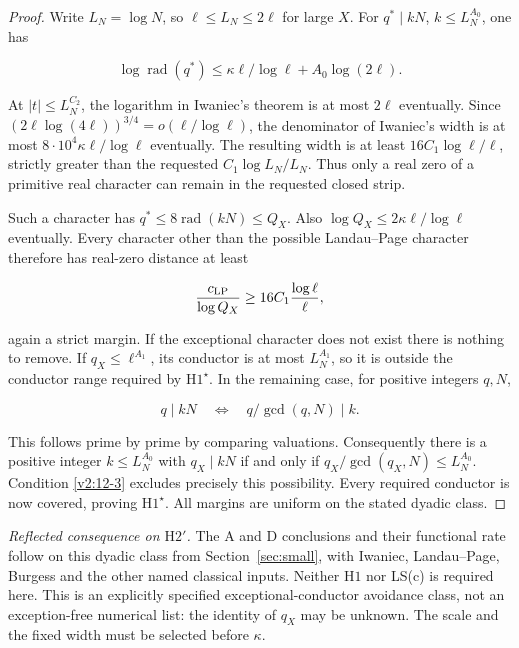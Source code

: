 \documentclass[11pt]{article}
\theoremstyle{definition}
\theoremstyle{remark}
\numberwithin{equation}{section}
\begin{document}
\begin{proof} Write $L_N=\log N$, so $\ell\le L_N\le2\ell$ for large $X$. For $q^*\mid kN$, $k\le L_N^{A_0}$, one has


\begin{equation}
\log\operatorname{rad}(q^*)\le\kappa\ell/\log\ell+A_0\log(2\ell).
\end{equation}


At $|t|\le L_N^{C_2}$, the logarithm in Iwaniec's theorem is at most $2\ell$ eventually. Since $(2\ell\log(4\ell))^{3/4}=o(\ell/\log\ell)$, the denominator of Iwaniec's width is at most $8\cdot10^4\kappa\ell/\log\ell$ eventually. The resulting width is at least $16C_1\log\ell/\ell$, strictly greater than the requested $C_1\log L_N/L_N$. Thus only a real zero of a primitive real character can remain in the requested closed strip.

Such a character has $q^*\le8\operatorname{rad}(kN)\le Q_X$. Also $\log Q_X\le2\kappa\ell/\log\ell$ eventually. Every character other than the possible Landau--Page character therefore has real-zero distance at least


\begin{equation}
\frac{c_{\rm LP}}{\log Q_X}\ge16C_1\frac{\log\ell}{\ell},
\end{equation}


again a strict margin. If the exceptional character does not exist there is nothing to remove. If $q_X\le\ell^{A_1}$, its conductor is at most $L_N^{A_1}$, so it is outside the conductor range required by $\mathrm H1^\star$. In the remaining case, for positive integers $q,N$,


\begin{equation}
q\mid kN\quad\Longleftrightarrow\quad q/\gcd(q,N)\mid k.
\end{equation}


This follows prime by prime by comparing valuations. Consequently there is a positive integer $k\le L_N^{A_0}$ with $q_X\mid kN$ if and only if $q_X/\gcd(q_X,N)\le L_N^{A_0}$. Condition \eqref{v2:12-3} excludes precisely this possibility. Every required conductor is now covered, proving $\mathrm H1^\star$. All margins are uniform on the stated dyadic class. \end{proof}

\emph{Reflected consequence on $\mathrm H2'$.} The A and D conclusions and their functional rate follow on this dyadic class from Section~\ref{sec:small}, with Iwaniec, Landau--Page, Burgess and the other named classical inputs. Neither $\mathrm H1$ nor LS(c) is required here. This is an explicitly specified exceptional-conductor avoidance class, not an exception-free numerical list: the identity of $q_X$ may be unknown. The scale and the fixed width must be selected before $\kappa$. 
\end{document}
